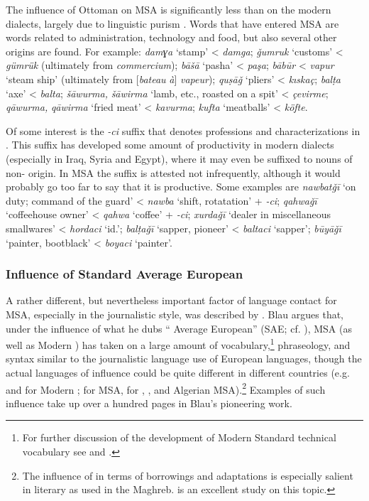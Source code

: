 \documentclass[output=paper]{langsci/langscibook}
\begin{document}
The influence of Ottoman  on MSA is significantly less than on the modern  dialects, largely due to linguistic purism \citep{Procházka2011Turkish}. Words that have entered MSA are words related to administration, technology and food, but also several other origins are found. For example: \textit{damɣa} ‘stamp’ < \textit{damga}; \textit{ǧumruk} ‘customs’ < \textit{gümrük} (ultimately from  \textit{commercium}); \textit{bāšā} ‘pasha’ < \textit{paşa}; \textit{bābūr} < \textit{vapur} ‘steam ship’ (ultimately from  [\textit{bateau} \textit{à}] \textit{vapeur}); \textit{quṣāǧ} ‘pliers’ < \textit{kıskaç}; \textit{balṭa} ‘axe’ < \textit{balta}; \textit{šāwurma,} \textit{šāwirma} ‘lamb, etc., roasted on a spit’ < \textit{çevirme}; \textit{qāwurma,} \textit{qāwirma} ‘fried meat’ < \textit{kavurma}; \textit{kufta} ‘meatballs’ < \textit{köfte}.

Of some interest is the \textit{-ci} suffix that denotes professions and characterizations in . This suffix has developed some amount of productivity in modern dialects (especially in Iraq, Syria and Egypt), where it may even be suffixed to nouns of non- origin. In MSA the suffix is attested not infrequently, although it would probably go too far to say that it is productive. Some examples are \textit{nawbatǧī} ‘on duty; command of the guard’ < \textit{nawba} ‘shift, rotatation’ + \textit{-ci}; \textit{qahwaǧī} ‘coffeehouse owner’ < \textit{qahwa} ‘coffee’ + \textit{-ci}; \textit{xurdaǧī} ‘dealer in miscellaneous smallwares’ < \textit{hordaci} ‘id.’; \textit{balṭaǧī} ‘sapper, pioneer’ < \textit{baltaci} ‘sapper’; \textit{būyāǧī} ‘painter, bootblack’ < \textit{boyaci} ‘painter’.

\subsubsection{Influence of Standard Average European}

A rather different, but nevertheless important factor of language contact for MSA, especially in the journalistic style, was described by \citet{Blau1969}. Blau argues that, under the influence of what he dubs “ Average European” (SAE; cf. \citealt{Whorf1956}), MSA (as well as Modern ) has taken on a large amount of vocabulary,\footnote{For further discussion of the development of Modern Standard  technical vocabulary see \citet{Dichy2011} and \citet{Jacquart94}.} phraseology, and syntax similar to the journalistic language use of European languages, though the actual languages of influence could be quite different in different countries (e.g.  and  for Modern ;  for  MSA,  for , ,  and Algerian MSA).\footnote{The influence of  in terms of borrowings and adaptations is especially salient in literary  as used in the Maghreb. \citet{Kropftisch1977} is an excellent study on this topic.} Examples of such influence take up over a hundred pages in Blau’s pioneering work.
\end{document}
